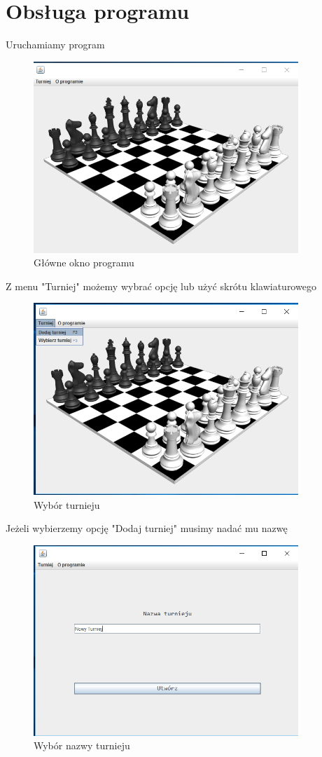 \chapter{Obsługa programu}
Uruchamiamy program
\begin{figure}[H]
	\centering
	\includegraphics[width=10cm]{fig/1}
	\caption{Główne okno programu}
	\label {fig:glowne_okno_programu} 
\end{figure}
Z menu "Turniej" możemy wybrać opcję lub użyć skrótu klawiaturowego
\begin{figure}[H]
	\centering
	\includegraphics[width=10cm]{fig/2}
	\caption{Wybór turnieju}
	\label {fig:wybor_turnieju} 
\end{figure}
Jeżeli wybierzemy opcję "Dodaj turniej" musimy nadać mu nazwę
\begin{figure}[H]
	\centering
	\includegraphics[width=10cm]{fig/3}
	\caption{Wybór nazwy turnieju}
	\label {fig:wybor_nazwy_turnieju} 
\end{figure}
